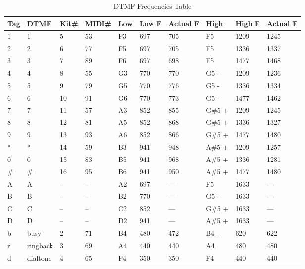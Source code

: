 \label{table:effect_dial_tones}
\begin{longtable}{l l l l l l l l l l}
   \caption{DTMF Frequencies Table} \\
   \hline
      \textbf{Tag} &
      \textbf{DTMF} &
      \textbf{Kit\#} &
      \textbf{MIDI\#} &
      \textbf{Low} &
      \textbf{Low F} &
      \textbf{Actual F} &
      \textbf{High} &
      \textbf{High F} &
      \textbf{Actual F} \\
   \hline
   \endfirsthead

   1 &  1        & 5  & 53 & F3 &  697 &  705 &  F5     & 1209 &  1245  \\
   2 &  2        & 6  & 77 & F5 &  697 &  705 &  F5     & 1336 &  1337  \\
   3 &  3        & 7  & 89 & F6 &  697 &  698 &  F5     & 1477 &  1468  \\
   4 &  4        & 8  & 55 & G3 &  770 &  770 &  G5 -   & 1209 &  1236  \\
   5 &  5        & 9  & 79 & G5 &  770 &  776 &  G5 -   & 1336 &  1334  \\
   6 &  6        & 10 & 91 & G6 &  770 &  773 &  G5 -   & 1477 &  1462  \\
   7 &  7        & 11 & 57 & A3 &  852 &  855 &  G\#5 + & 1209 &  1245  \\
   8 &  8        & 12 & 81 & A5 &  852 &  868 &  G\#5 + & 1336 &  1327  \\
   9 &  9        & 13 & 93 & A6 &  852 &  866 &  G\#5 + & 1477 &  1480  \\
   * &  *        & 14 & 59 & B3 &  941 &  948 &  A\#5 + & 1209 &  1257  \\
   0 &  0        & 15 & 83 & B5 &  941 &  968 &  A\#5 + & 1336 &  1281  \\
  \# &  \#       & 16 & 95 & B6 &  941 &  950 &  A\#5 + & 1477 &  1480  \\
   A &  A        & -- & -- & A2 &  697 &  --- &  F5     & 1633 &  ---   \\
   B &  B        & -- & -- & B2 &  770 &  --- &  G5 -   & 1633 &  ---   \\
   C &  C        & -- & -- & C2 &  852 &  --- &  G\#5 + & 1633 &  ---   \\
   D &  D        & -- & -- & D2 &  941 &  --- &  A\#5 + & 1633 &  ---   \\
   b &  busy     & 2  & 71 & B4 &  480 &  472 &  B4 -   & 620  &  622   \\
   r &  ringback & 3  & 69 & A4 &  440 &  440 &  A4     & 480  &  480   \\
   d &  dialtone & 4  & 65 & F4 &  350 &  350 &  F4     & 440  &  440   \\
\end{longtable}

